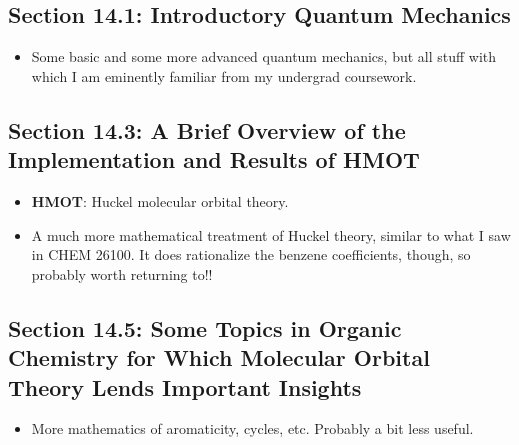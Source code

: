 \documentclass[../notes.tex]{subfiles}
\begin{document}
\subsection*{Section 14.1: Introductory Quantum Mechanics}
\begin{itemize}
    \item Some basic and some more advanced quantum mechanics, but all stuff with which I am eminently familiar from my undergrad coursework.
\end{itemize}


\subsection*{Section 14.3: A Brief Overview of the Implementation and Results of HMOT}
\begin{itemize}
    \item \textbf{HMOT}: Huckel molecular orbital theory.
    \item A much more mathematical treatment of Huckel theory, similar to what I saw in CHEM 26100. It does rationalize the benzene coefficients, though, so probably worth returning to!!
\end{itemize}


\subsection*{Section 14.5: Some Topics in Organic Chemistry for Which Molecular Orbital Theory Lends Important Insights}
\begin{itemize}
    \item More mathematics of aromaticity, cycles, etc. Probably a bit less useful.
\end{itemize}
\end{document}
